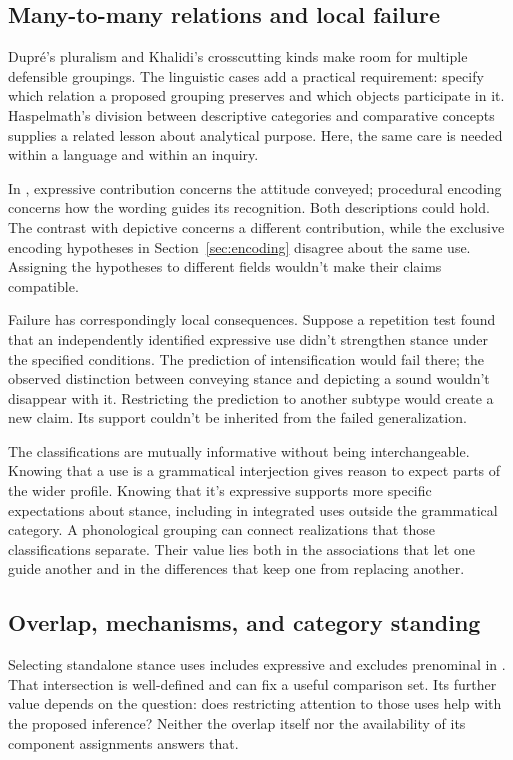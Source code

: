 \documentclass[12pt]{article}
\begin{document}
\subsection{Many-to-many relations and local failure}

Dupr\'e's pluralism and Khalidi's crosscutting kinds make room for
multiple defensible groupings. The linguistic cases add a practical
requirement: specify which relation a proposed grouping preserves and
which objects participate in it. Haspelmath's division between descriptive
categories and comparative concepts supplies a related lesson about
analytical purpose. Here, the same care is needed within a language
and within an inquiry.

In , expressive contribution concerns
the attitude conveyed; procedural encoding concerns how the wording
guides its recognition. Both descriptions could hold. The contrast with
depictive  concerns a different contribution, while the
exclusive encoding hypotheses in Section~\ref{sec:encoding} disagree about
the same use. Assigning the hypotheses to different fields wouldn't
make their claims compatible.

Failure has correspondingly local consequences. Suppose a repetition
test found that an independently identified expressive use didn't
strengthen stance under the specified conditions. The prediction of
intensification would fail there; the observed distinction between
conveying stance and depicting a sound wouldn't disappear with it.
Restricting the prediction to another subtype would create a new
claim. Its support couldn't be inherited from the failed generalization.

The classifications are mutually informative without being interchangeable.
Knowing that a use is a grammatical interjection gives reason to
expect parts of the wider profile. Knowing that it's expressive
supports more specific expectations about stance, including in integrated
uses outside the grammatical category. A phonological grouping can
connect realizations that those classifications separate. Their value lies
both in the associations that let one guide another and in the
differences that keep one from replacing another.

\subsection{Overlap, mechanisms, and category standing}

Selecting standalone stance uses includes expressive 
and excludes prenominal  in . That
intersection is well-defined and can fix a useful comparison set.
Its further value depends on the question: does restricting attention
to those uses help with the proposed inference? Neither the overlap
itself nor the availability of its component assignments answers that.
\end{document}
